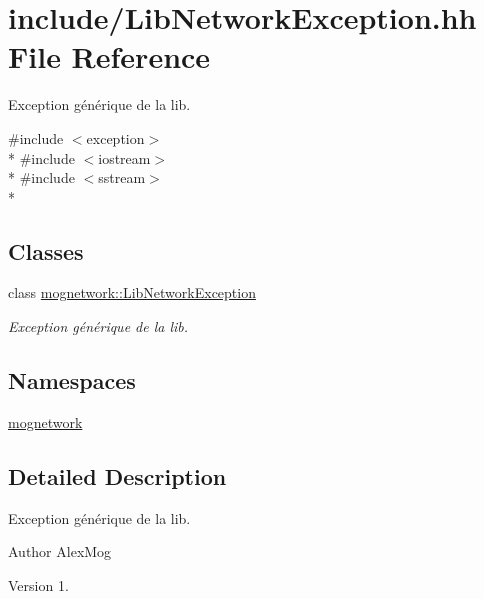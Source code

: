 \hypertarget{_lib_network_exception_8hh}{\section{include/\-Lib\-Network\-Exception.hh File Reference}
\label{_lib_network_exception_8hh}
}


Exception générique de la lib.  


{\ttfamily \#include $<$exception$>$}\\*
{\ttfamily \#include $<$iostream$>$}\\*
{\ttfamily \#include $<$sstream$>$}\\*
\subsection*{Classes}
\begin{DoxyCompactItemize}
\item 
class \hyperlink{classmognetwork_1_1_lib_network_exception}{mognetwork\-::\-Lib\-Network\-Exception}
\begin{DoxyCompactList}\small\item\em Exception générique de la lib. \end{DoxyCompactList}\end{DoxyCompactItemize}
\subsection*{Namespaces}
\begin{DoxyCompactItemize}
\item 
\hyperlink{namespacemognetwork}{mognetwork}
\end{DoxyCompactItemize}


\subsection{Detailed Description}
Exception générique de la lib. \begin{DoxyAuthor}{Author}
Alex\-Mog 
\end{DoxyAuthor}
\begin{DoxyVersion}{Version}
1. 
\end{DoxyVersion}
